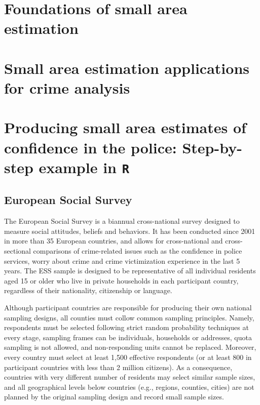 \documentclass[
]{article}
\begin{document}
\hypertarget{foundations-of-small-area-estimation}{%
\section{Foundations of small area
estimation}\label{foundations-of-small-area-estimation}}

\hypertarget{small-area-estimation-applications-for-crime-analysis}{%
\section{Small area estimation applications for crime
analysis}\label{small-area-estimation-applications-for-crime-analysis}}

\hypertarget{producing-small-area-estimates-of-confidence-in-the-police-step-by-step-example-in-r}{%
\section{\texorpdfstring{Producing small area estimates of confidence in
the police: Step-by-step example in
\texttt{R}}{Producing small area estimates of confidence in the police: Step-by-step example in R}}\label{producing-small-area-estimates-of-confidence-in-the-police-step-by-step-example-in-r}}

\hypertarget{european-social-survey}{%
\subsection{European Social Survey}\label{european-social-survey}}

The European Social Survey is a biannual cross-national survey designed
to measure social attitudes, beliefs and behaviors. It has been
conducted since 2001 in more than 35 European countries, and allows for
cross-national and cross-sectional comparisons of crime-related issues
such as the confidence in police services, worry about crime and crime
victimization experience in the last 5 years. The ESS sample is designed
to be representative of all individual residents aged 15 or older who
live in private households in each participant country, regardless of
their nationality, citizenship or language.

Although participant countries are responsible for producing their own
national sampling designs, all counties must collow common sampling
principles. Namely, respondents must be selected following strict random
probability techniques at every stage, sampling frames can be
individuals, households or addresses, quota sampling is not allowed, and
non-responding units cannot be replaced. Moreover, every country must
select at least 1,500 effective respondents (or at least 800 in
participant countries with less than 2 million citizens). As a
consequence, countries with very different number of residents may
select similar sample sizes, and all geographical levels below countries
(e.g., regions, counties, cities) are not planned by the original
sampling design and record small sample sizes.
\end{document}
